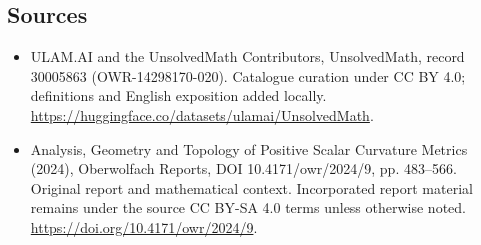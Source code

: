 \documentclass[11pt]{article}
\begin{document}
\subsection{Sources}
\begin{itemize}
\item[\hypertarget{source:30005863:1}{S1}] ULAM.AI and the UnsolvedMath Contributors, UnsolvedMath, record 30005863 (OWR-14298170-020). Catalogue curation under CC BY 4.0; definitions and English exposition added locally.
\url{https://huggingface.co/datasets/ulamai/UnsolvedMath}.
\item[\hypertarget{source:30005863:2}{S2}] Analysis, Geometry and Topology of Positive Scalar Curvature Metrics (2024), Oberwolfach Reports, DOI 10.4171/owr/2024/9, pp. 483--566. Original report and mathematical context. Incorporated report material remains under the source CC BY-SA 4.0 terms unless otherwise noted.
\url{https://doi.org/10.4171/owr/2024/9}.
\end{itemize}
\label{end:30005863}
\end{document}
